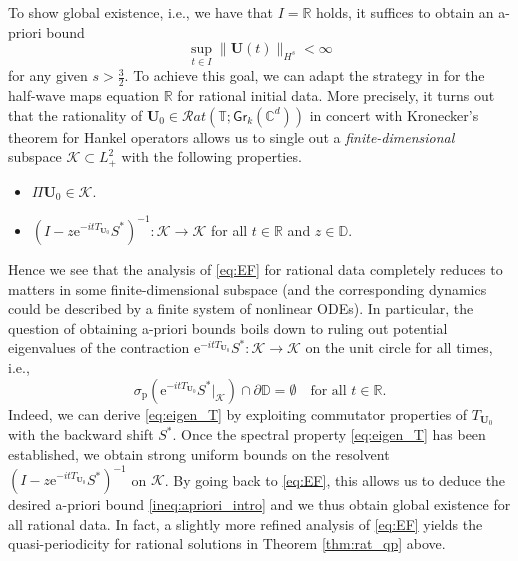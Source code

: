 \documentclass[10pt,reqno,a4paper]{amsart}
\theoremstyle{definition}
\theoremstyle{remark}
\theoremstyle{remark}
\numberwithin{equation}{section}
\newcommand{\C}{\mathbb{C}}
\newcommand{\R}{\mathbb{R}}
\newcommand{\T}{\mathbb{T}}
\newcommand{\D}{\mathbb{D}}
\newcommand{\pt}{\partial}
\renewcommand{\sp}{\sigma_{\mathrm{p}}}
\newcommand{\be}{\begin{equation}}
\newcommand{\ee}{\end{equation}}
\newcommand{\eu}{\mathrm{e}}
\newcommand{\Ub}{\mathbf{U}}
\newcommand{\id}{I}
\newcommand{\Gr}{\mathsf{Gr}}
\newcommand{\Ks}{\mathscr{K}}
\begin{document}
To show global existence, i.e., we have that $I = \R$ holds, it suffices to obtain an a-priori bound
\be \label{ineq:apriori_intro}
\sup_{t \in I} \| \Ub(t) \|_{H^s} < \infty
\ee
for any given $s > \frac 3 2$. To achieve this goal, we can adapt the strategy in \cite{GeLe-25} for the half-wave maps equation $\R$ for rational initial data. More precisely, it turns out that the rationality of $\Ub_0 \in \mathcal{R}at(\T; \Gr_k(\C^d))$ in concert with Kronecker's theorem for Hankel operators allows us to single out a {\em finite-dimensional} subspace $\Ks \subset L^2_+$ with the following properties. 
\begin{itemize}
\item[1)] $\Pi \Ub_0 \in \Ks$.
\item[2)] $(\id - z \eu^{-it T_{\Ub_0}} S^*)^{-1} : \Ks \to \Ks$ for all $t \in \R$ and $z \in \D$.
\end{itemize}
Hence we see that the analysis of \eqref{eq:EF} for rational data completely reduces to matters in some finite-dimensional subspace (and the corresponding dynamics could be described by a finite system of nonlinear ODEs). In particular, the question of obtaining a-priori bounds boils down to ruling out potential eigenvalues of the contraction $\eu^{-itT_{\Ub_0}} S^* : \Ks \to \Ks$ on the unit circle for all times, i.e.,
\be \label{eq:eigen_T}
\sp(\eu^{-it T_{\Ub_0}} S^* |_\Ks) \cap \pt \D = \emptyset \quad \mbox{for all $t \in \R$}.
\ee 
Indeed, we can derive \eqref{eq:eigen_T} by exploiting commutator properties of $T_{\Ub_0}$ with the backward shift $S^*$. Once the spectral property \eqref{eq:eigen_T} has been established, we obtain strong uniform bounds on the resolvent $(\id - z \eu^{-it T_{\Ub_0}} S^*)^{-1}$ on $\Ks$. By going back to \eqref{eq:EF}, this allows us to deduce the desired a-priori bound \eqref{ineq:apriori_intro} and we thus obtain global existence for all rational data. In fact, a slightly more refined analysis of \eqref{eq:EF} yields the quasi-periodicity for rational solutions in Theorem \ref{thm:rat_qp} above.
\end{document}
